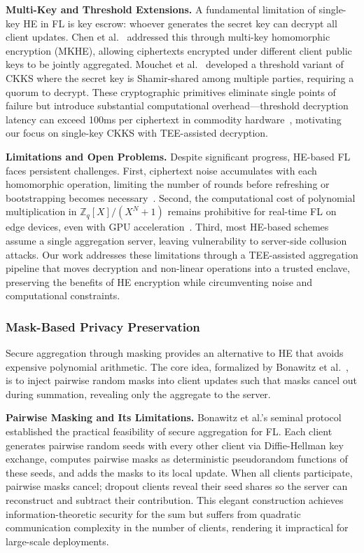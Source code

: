 \textbf{Multi-Key and Threshold Extensions.} A fundamental limitation of single-key HE in FL is key escrow: whoever generates the secret key can decrypt all client updates. Chen et al.~\cite{chen2019efficient} addressed this through multi-key homomorphic encryption (MKHE), allowing ciphertexts encrypted under different client public keys to be jointly aggregated. Mouchet et al.~\cite{mouchet2021multiparty} developed a threshold variant of CKKS where the secret key is Shamir-shared among multiple parties, requiring a quorum to decrypt. These cryptographic primitives eliminate single points of failure but introduce substantial computational overhead---threshold decryption latency can exceed 100ms per ciphertext in commodity hardware~\cite{mouchet2021multiparty}, motivating our focus on single-key CKKS with TEE-assisted decryption.

\textbf{Limitations and Open Problems.} Despite significant progress, HE-based FL faces persistent challenges. First, ciphertext noise accumulates with each homomorphic operation, limiting the number of rounds before refreshing or bootstrapping becomes necessary~\cite{cheon2017homomorphic}. Second, the computational cost of polynomial multiplication in $\mathbb{Z}_q[X]/(X^N+1)$ remains prohibitive for real-time FL on edge devices, even with GPU acceleration~\cite{albadawi2020alexnet}. Third, most HE-based schemes assume a single aggregation server, leaving vulnerability to server-side collusion attacks. Our work addresses these limitations through a TEE-assisted aggregation pipeline that moves decryption and non-linear operations into a trusted enclave, preserving the benefits of HE encryption while circumventing noise and computational constraints.

\subsubsection{Mask-Based Privacy Preservation}
\label{subsubsec:mask-based}

Secure aggregation through masking provides an alternative to HE that avoids expensive polynomial arithmetic. The core idea, formalized by Bonawitz et al.~\cite{bonawitz2017practical}, is to inject pairwise random masks into client updates such that masks cancel out during summation, revealing only the aggregate to the server.

\textbf{Pairwise Masking and Its Limitations.} Bonawitz et al.'s seminal protocol~\cite{bonawitz2017practical} established the practical feasibility of secure aggregation for FL. Each client generates pairwise random seeds with every other client via Diffie-Hellman key exchange, computes pairwise masks as deterministic pseudorandom functions of these seeds, and adds the masks to its local update. When all clients participate, pairwise masks cancel; dropout clients reveal their seed shares so the server can reconstruct and subtract their contribution. This elegant construction achieves information-theoretic security for the sum but suffers from quadratic communication complexity in the number of clients, rendering it impractical for large-scale deployments.

